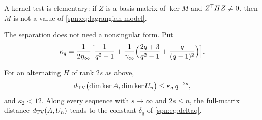 A kernel test is elementary: if $Z$ is a basis matrix of $\ker M$ and $Z^{\mathsf{T}}HZ\ne0$, then
$M$ is not a value of \eqref{spn:eq:lagrangian-model}.

The separation does not need a nonsingular form. Put
\[
 \kappa_q=\frac1{2\eta_\infty}\Bigl[\frac1{q^2-1}+\frac1{\gamma_\infty}\Bigl(\frac{2q+3}{q^2-1}
 +\frac{q}{(q-1)^2}\Bigr)\Bigr].
\]

\begin{theorem}\label{spn:thm:growing-form}
For an alternating $H$ of rank $2s$ as above,
\[
 d_{\mathrm{TV}}\bigl(\dim\ker A,\dim\ker U_n\bigr)\le\kappa_q\,q^{-2s},
\]
and $\kappa_2<12$. Along every sequence with $s\to\infty$ and $2s\le n$, the full-matrix
distance $d_{\mathrm{TV}}(A,U_n)$ tends to the constant $\delta_q$ of \eqref{spn:eq:deltaq}.
\end{theorem}

